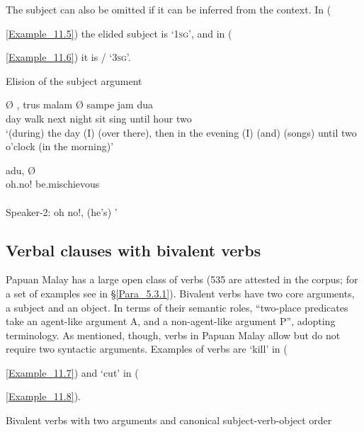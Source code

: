 {{{{{The subject can also be omitted if it can be inferred from the context. In ({\ref{Example_11.5}) the elided subject is  ‘\textsc{1sg}’, and in ({\ref{Example_11.6}) it is / ‘\textsc{3sg}’.


\begin{styleExampleTitle}
Elision of the subject argument
\end{styleExampleTitle}

\ea
\label{Example_11.5}
 {Ø} {,} {trus} {malam} {Ø} {} {} {sampe} {jam} {dua}\\ %
 day  {}  walk  next  night  {}   sit  sing  until  hour  two\\
\glt 
‘(during) the day (I)  (over there), then in the evening (I)  (and)  (songs) until two o’clock (in the morning)’ \textstyleExampleSource{[080923-003-CvNP.0002]}
\z

\ea
\label{Example_11.6}
 {adu,} {Ø} {}\\ %
 {}   oh.no!    {} be.mischievous\\
\\
Speaker-2: oh no!, (he’s) ’ \textstyleExampleSource{[081115-001a-Cv.0033]}
\z

\subsection{Verbal clauses with {bivalent} verbs}
\label{Para_11.1.2}
Papuan Malay has a large open class of  verbs (535 are attested in the corpus; for a set of examples see  in §\ref{Para_5.3.1}). Bivalent verbs have two core arguments, a subject and an object. In terms of their semantic roles, “two-place predicates take an agent-like argument A, and a non-agent-like argument P”, adopting  terminology. As mentioned, though,  verbs in Papuan Malay allow but do not require two syntactic arguments. Examples of  verbs are  ‘kill’ in ({\ref{Example_11.7}) and  ‘cut’ in ({\ref{Example_11.8}).


\begin{styleExampleTitle}
Bivalent verbs with two arguments and canonical subject-verb-object order
\end{styleExampleTitle}

}}}}}}}}}
